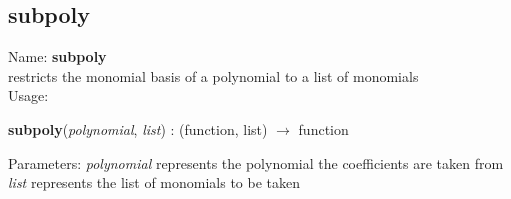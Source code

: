 \subsection{ subpoly }
\noindent Name: \textbf{subpoly}\\
restricts the monomial basis of a polynomial to a list of monomials\\

\noindent Usage: 
\begin{center}
\textbf{subpoly}(\emph{polynomial}, \emph{list}) : (\textsf{function}, \textsf{list}) $\rightarrow$ \textsf{function}\\
\end{center}
Parameters: 
\emph{polynomial} represents the polynomial the coefficients are taken from\\
\emph{list} represents the list of monomials to be taken\\


